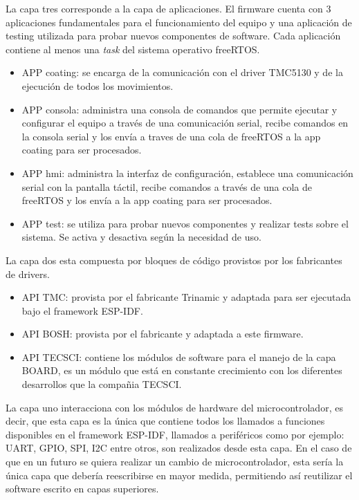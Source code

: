 La capa tres corresponde a la capa de aplicaciones. El firmware cuenta con 3 aplicaciones fundamentales para el funcionamiento del equipo y una aplicación de testing utilizada para probar nuevos componentes de software. Cada aplicación contiene al menos una \textit{task} del sistema operativo freeRTOS.

\begin{itemize}

\item APP coating: se encarga de la comunicación con el driver TMC5130 y de la ejecución de todos los movimientos.
\item APP consola: administra una consola de comandos que permite ejecutar y configurar el equipo a través de una comunicación serial, recibe comandos en la consola serial y los envía a traves de una cola de freeRTOS a la app coating para ser procesados.
\item APP hmi: administra la interfaz de configuración, establece una comunicación serial con la pantalla táctil, recibe comandos a través de una cola de freeRTOS y los envía a la app coating para ser procesados.
\item APP test: se utiliza para probar nuevos componentes y realizar tests sobre el sistema. Se activa y desactiva según la necesidad de uso.

\end{itemize}

La capa dos esta compuesta por bloques de código provistos por los fabricantes de drivers.
\begin{itemize}
\item API TMC: provista por el fabricante Trinamic y adaptada para ser ejecutada bajo el framework ESP-IDF.
\item API BOSH: provista por el fabricante y adaptada a este firmware.
\item API TECSCI: contiene los módulos de software para el manejo de la capa BOARD, es un módulo que está en constante crecimiento con los diferentes desarrollos que la compañia TECSCI.
\end{itemize}

La capa uno interacciona con los módulos de hardware del microcontrolador, es decir, que esta capa es la única que contiene todos los llamados a funciones disponibles en el framework ESP-IDF, llamados a periféricos como por ejemplo: UART, GPIO, SPI, I2C entre otros, son realizados desde esta capa. En el caso de que en un futuro se quiera realizar un cambio de microcontrolador, esta sería la única capa que debería reescribirse en mayor medida, permitiendo así reutilizar el software escrito en capas superiores.

